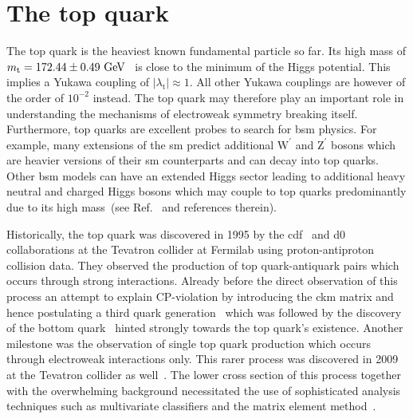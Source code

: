 \chapter{The top quark}


The top quark is the heaviest known fundamental particle so far. Its high mass of $m_\mathrm{t}=172.44\pm0.49~\mathrm{GeV}$~\cite{Khachatryan:2015hba} is close to the minimum of the Higgs potential. This implies a Yukawa coupling of $|\lambda_\mathrm{t}|\approx 1$. All other Yukawa couplings are however of the order of $10^{-2}$ instead. The top quark may therefore play an important role in understanding the mechanisms of electroweak symmetry breaking itself. Furthermore, top quarks are excellent probes to search for \gls{bsm} physics. For example, many extensions of the \gls{sm} predict additional $\mathrm{W}^{\prime}$ and $\mathrm{Z}^{\prime}$ bosons which are heavier versions of their \gls{sm} counterparts and can decay into top quarks. Other \gls{bsm} models can have an extended Higgs sector leading to additional heavy neutral and charged Higgs bosons which may couple to top quarks predominantly due to its high mass~(see Ref.~\cite{Boos:2006xe} and references therein). 

Historically, the top quark was discovered in 1995 by the \gls{cdf}~\cite{Abe:1995hr} and \gls{d0}~\cite{Abachi:1994td} collaborations at the Tevatron collider at Fermilab using proton-antiproton collision data. They observed the production of top quark-antiquark pairs which occurs through strong interactions. Already before the direct observation of this process an attempt to explain CP-violation by introducing the \gls{ckm} matrix and hence postulating a third quark generation~\cite{Kobayashi01021973} which was followed by the discovery of the bottom quark~\cite{Augustin:1975yq,PhysRevLett.39.252} hinted strongly towards the top quark's existence. Another milestone was the observation of single top quark production which occurs through electroweak interactions only. This rarer process was discovered in 2009 at the Tevatron collider as well~\cite{PhysRevLett.103.092002,PhysRevLett.103.092001}. The lower cross section of this process together with the overwhelming background necessitated the use of sophisticated analysis techniques such as multivariate classifiers and the matrix element method~\cite{Mitrevski}.

